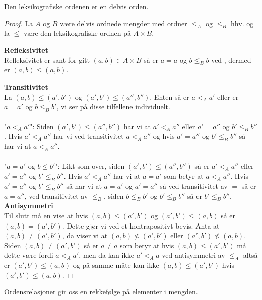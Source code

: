 \begin{proposisjon}\label{prop:LeksOrd}
    Den leksikografiske ordenen er en delvis orden.
\end{proposisjon}
\begin{proof}
    La $A$ og $B$ være delvis ordnede mengder med ordner $\leq_A$ og $\leq_B$ hhv. og la $\leq$ være den leksikografiske ordnen på $A\times B$. 

    \textbf{Refleksivitet}\\
    Refleksivitet er sant for gitt $(a,b)\in A\times B$ så er $a=a$ og $b\leq_B b$ ved , dermed er $(a,b)\leq (a,b)$.

    \textbf{Transitivitet}\\
    La $(a,b)\leq (a',b')$ og $(a',b')\leq (a'',b'')$. Enten så er $a<_A a'$ eller er $a=a'$ og $b\leq_B b'$, vi ser på disse tilfellene individuelt.\\\\
    "$a<_A a'$": Siden $(a',b')\leq (a'',b'')$ har vi at $a'<_A a''$ eller $a'=a''$ og $b'\leq_B b''$. 
    Hvis $a'<_A a''$ har vi ved transitivitet $a<_A a''$ og hvis $a'=a''$ og $b'\leq_B b''$ så har vi at $a<_A a''$.\\\\
    "$a=a'$ og $b\leq b'$": Likt som over, siden $(a',b')\leq (a'',b'')$ så er $a'<_A a''$ eller $a'=a''$ og $b'\leq_B b''$. Hvis $a'<_A a''$ har vi at $a=a'$ som betyr at $a<_A a''$. Hvis $a'=a''$ og $b'\leq_B b''$ så har vi at $a=a'$ og $a'=a''$ så ved transitivitet av $=$ så er $a=a''$, ved transitivitet av $\leq_B$, siden $b\leq_B b'$ og $b'\leq_B b''$ så er $b'\leq_B b''$.\\

    \textbf{Antisymmetri}\\
    Til slutt må en vise at hvis $(a,b)\leq(a',b')$ og $(a',b')\leq (a,b)$ så er $(a,b)=(a',b')$.
    Dette gjør vi ved et kontrapositivt bevis. Anta at $(a,b)\neq (a',b')$, da viser vi at $(a,b)\not\leq (a',b')$ eller $(a',b')\not\leq (a,b)$.
    Siden $(a,b)\neq (a',b')$ så er $a\neq a$ som betyr at hvis $(a,b)\leq (a',b')$ må dette være fordi $a<_A a'$, men da kan ikke $a'<_A a$ ved antisymmetri av $\leq_A$ altså er $(a',b')\leq (a,b)$ og på samme måte kan ikke $(a,b)\leq (a',b')$ hvis $(a',b')\leq (a,b)$.

\end{proof}

Ordensrelasjoner gir oss en rekkefølge på elementer i mengden. 
